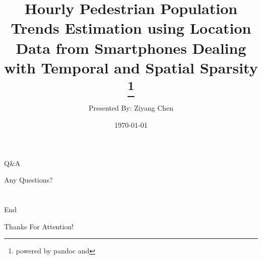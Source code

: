\documentclass[mathserif]{beamer}
\title[HPPTE]{Hourly Pedestrian Population Trends Estimation using Location Data from Smartphones
Dealing with Temporal and Spatial Sparsity \thanks{powered by pandoc and \XeLaTeX}}
\author{Presented By: Ziyang Chen}
\institute[FDU]
{
	Fudan University\\
	\medskip
	\textit{13307130148@fudan.edu.cn}
}
\date{\today}
\begin{document}
\newtheorem{property}[theorem]{\textsc{Property}}
\newtheorem{defination}[theorem]{\textsc{Defination}}
\newtheorem{theore}[theorem]{\textsc{Theorem}}
\newtheorem{lemm}[theorem]{\textsc{Lemma}}

\begin{frame}
\titlepage
\end{frame}




\AtBeginSection{}

\section[Q\&{}A]{}
\begin{frame}{Q\&{}A}
\begin{center}
  \color{blue}\huge{Any Questions?}
\end{center}
\end{frame}

\section[End]{}
\begin{frame}{End}
\begin{center}
  \color{blue}\huge{Thanks For Attention!}
\end{center}
\end{frame}
\end{document}
